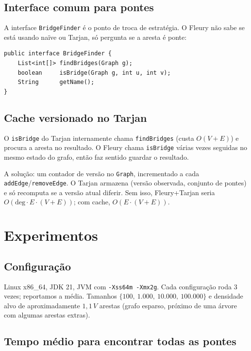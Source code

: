 \documentclass[a4paper,11pt]{article}
\begin{document}
\subsection{Interface comum para pontes}

A interface \texttt{BridgeFinder} é o ponto de troca de estratégia. O Fleury não sabe se está usando naïve ou Tarjan, só pergunta se a aresta é ponte:

\begin{lstlisting}
public interface BridgeFinder {
    List<int[]> findBridges(Graph g);
    boolean     isBridge(Graph g, int u, int v);
    String      getName();
}
\end{lstlisting}

\subsection{Cache versionado no Tarjan}

O \texttt{isBridge} do Tarjan internamente chama \texttt{findBridges} (custa $O(V+E)$) e procura a aresta no resultado. O Fleury chama \texttt{isBridge} várias vezes seguidas no mesmo estado do grafo, então faz sentido guardar o resultado.

A solução: um contador de versão no \texttt{Graph}, incrementado a cada \texttt{addEdge}/\texttt{removeEdge}. O Tarjan armazena (versão observada, conjunto de pontes) e só recomputa se a versão atual diferir. Sem isso, Fleury+Tarjan seria $O(\mathrm{deg}\cdot E\cdot(V+E))$; com cache, $O(E\cdot(V+E))$.

\section{Experimentos}

\subsection{Configuração}

Linux x86\_64, JDK 21, JVM com \texttt{-Xss64m -Xmx2g}. Cada configuração roda 3 vezes; reportamos a média. Tamanhos $\{100,\ 1.000,\ 10.000,\ 100.000\}$ e densidade alvo de aproximadamente $1{,}1\,V$ arestas (grafo esparso, próximo de uma árvore com algumas arestas extras).

\subsection{Tempo médio para encontrar todas as pontes}
\end{document}
